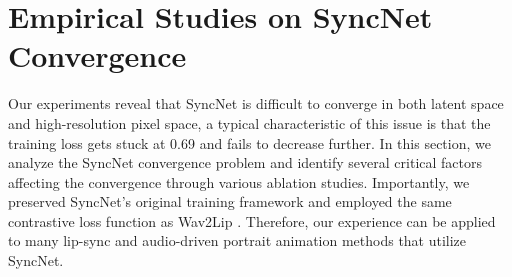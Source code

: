 


\section{Empirical Studies on SyncNet Convergence}
\label{sec:syncnet}
Our experiments reveal that SyncNet is difficult to converge in both latent space and high-resolution pixel space, a typical characteristic of this issue is that the training loss gets stuck at 0.69 and fails to decrease further. In this section, we analyze the SyncNet convergence problem and identify several critical factors affecting the convergence through various ablation studies. Importantly, we preserved SyncNet's original training framework and employed the same contrastive loss function as Wav2Lip \cite{prajwal2020lip}. Therefore, our experience can be applied to many lip-sync \cite{prajwal2020lip,guan2023stylesync,mukhopadhyay2024diff2lip,cheng2022videoretalking,zhang2023dinet,zhang2024musetalk} and audio-driven portrait animation methods \cite{ma2023dreamtalk,ye2023geneface} that utilize SyncNet.

